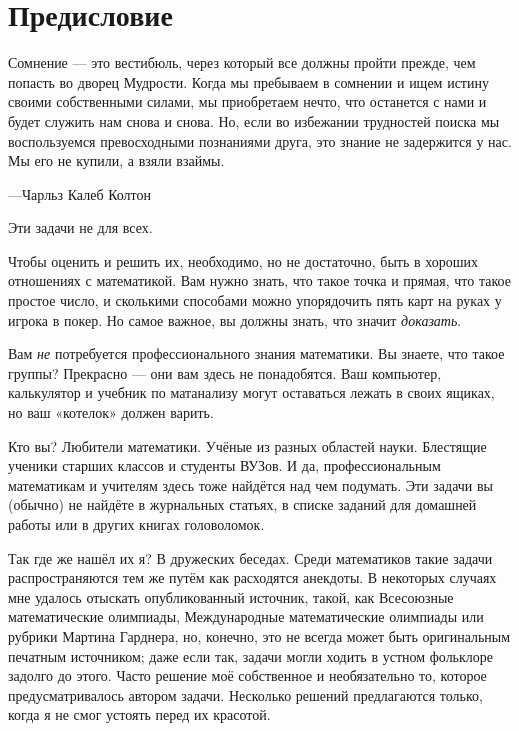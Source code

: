 \chapter*{Предисловие}

\setlength{\epigraphwidth}{.84\textwidth}
\epigraph{Сомнение --- это вестибюль, через который все должны пройти прежде, чем попасть во дворец Мудрости.
Когда мы пребываем в сомнении и ищем истину своими собственными силами, мы приобретаем нечто, что останется с нами и будет служить нам снова и снова.
Но, если во избежании трудностей поиска мы воспользуемся превосходными познаниями друга, это знание не задержится у нас.
Мы его не купили, а взяли взаймы.}{---Чарльз Калеб Колтон}
                                                                                     

Эти задачи не для всех.

Чтобы оценить и решить их, необходимо, но не достаточно, быть в хороших отношениях с математикой.
Вам нужно знать, что такое точка и прямая, что такое простое число, и сколькими способами можно упорядочить пять карт на руках у игрока в покер.
Но самое важное, вы должны знать, что значит \emph{доказать}.

Вам \emph{не} потребуется профессионального знания математики.
Вы знаете, что такое группы? Прекрасно ---  они вам здесь не понадобятся.
Ваш компьютер, калькулятор и учебник по матанализу могут оставаться лежать в своих ящиках, но ваш «котелок» должен варить.

Кто вы? Любители математики.
Учёные из разных областей науки.
Блестящие ученики старших классов и студенты ВУЗов.
И да, профессиональным математикам и учителям здесь тоже найдётся над чем подумать.
Эти задачи вы (обычно) не найдёте в журнальных статьях, в списке заданий для домашней работы или в других книгах головоломок.

Так где же нашёл их я? В дружеских беседах.
Среди математиков такие задачи распространяются тем же путём как расходятся анекдоты.
В некоторых случаях мне удалось отыскать опубликованный источник, такой, как Всесоюзные математические олимпиады, Международные математические олимпиады или рубрики Мартина Гарднера, но, конечно, это не всегда может быть оригинальным печатным источником;
даже если так, задачи могли ходить в устном фольклоре задолго до этого.
Часто решение моё собственное и необязательно то, которое предусматривалось автором задачи.
Несколько решений предлагаются только, когда я не смог устоять перед их красотой.

